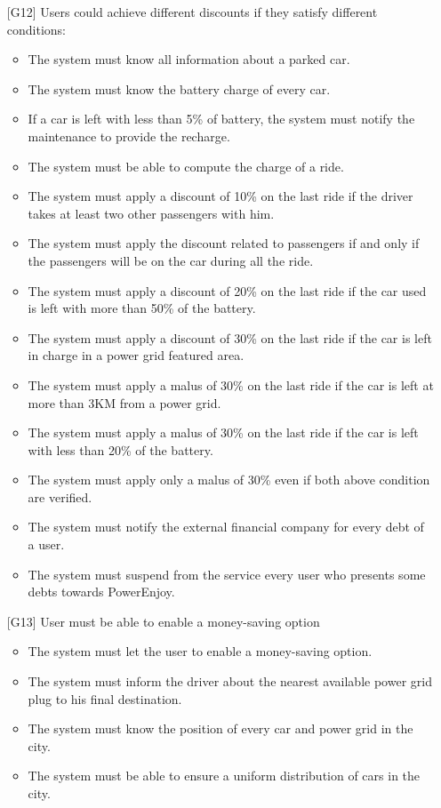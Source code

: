 \documentclass[10pt, a4paper,titlepage]{article}
\begin{document}
\begin{itemize}
\item[{[G12]}] Users could achieve different discounts if they satisfy different conditions:
\begin{itemize}
\item The system must know all information about a parked car.
\item The system must know the battery charge of every car.
\item If a car is left with less than 5\% of battery, the system must notify the maintenance to provide the recharge.
\item The system must be able to compute the charge of a ride.
\item The system must apply a discount of 10\% on the last ride if the driver takes at least two other passengers with him.
\item The system must apply the discount related to passengers if and only if the passengers will be on the car during all the ride.
\item The system must apply a discount of 20\% on the last ride if the car used is left with more than 50\% of the battery.
\item The system must apply a discount of 30\% on the last ride if the car is left in charge in a power grid featured area.
\item The system must apply a malus of 30\% on the last ride if the car is left at more than 3KM from a power grid.
\item The system must apply a malus of 30\% on the last ride if the car is left with less than 20\% of the battery.
\item The system must apply only a malus of 30\% even if both above condition are verified.
\item The system must notify the external financial company for every debt of a user.
\item The system must suspend from the service every user who presents some debts towards PowerEnjoy.
\end{itemize}
\item[{[G13]}] User must be able to enable a money-saving option
\begin{itemize}
\item The system must let the user to enable a money-saving option.
\item The system must inform the driver about the nearest available power grid plug to his final destination.
\item The system must know the position of every car and power grid in the city.
\item The system must be able to ensure a uniform distribution of cars in the city.
\end{itemize}
\end{itemize}
\end{document}
